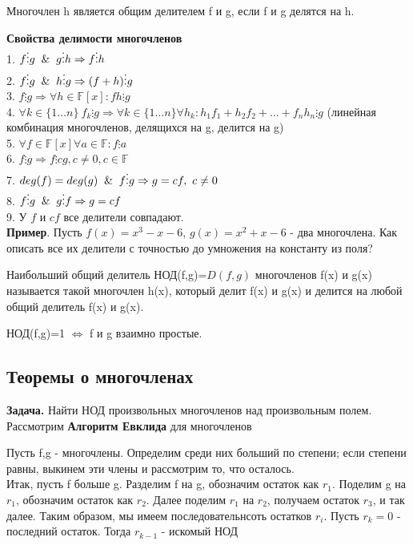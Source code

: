 \begin{defin}
Многочлен h является общим делителем f и g, если f и g делятся на h.
\end{defin}
\textbf{Свойства делимости многочленов}\\
1. $f\vdots g \And g\vdots h \Rightarrow f\vdots h$\\
2. $f\vdots g \And h\vdots g \Rightarrow (f+h)\vdots g$\\
3. $f\vdots g \Rightarrow \forall h \in \mathbb F[x] \colon fh\vdots g$\\
4. $\forall k\in\{1\ldots n\}~f_k\vdots g \Rightarrow \forall k\in\{1\ldots n\}
\forall h_k\colon h_1f_1+h_2f_2+\ldots+f_nh_n\vdots g$
(линейная комбинация многочленов, делящихся на g, делится на g)\\
5. $\forall f\in \mathbb F[x] \forall a\in \mathbb F \colon f\vdots a$\\
6. $f\vdots g \Rightarrow f\vdots cg, c\ne0, c\in\mathbb F$\\
7. $deg(f)=deg(g) \And f\vdots g\Rightarrow g=cf,~c\ne0$\\
8. $f\vdots g \And g\vdots f \Rightarrow g=cf$\\
9. У $f$ и $cf$ все делители совпадают.\\
\textbf{Пример}. Пусть $f(x)=x^3-x-6$, $g(x)=x^2+x-6$ - два многочлена.
Как описать все их делители с точностью до умножения на константу из поля?
\begin{defin}
Наибольший общий делитель НОД(f,g)=$D(f,g)$ многочленов f(x) и g(x) 
называется такой многочлен h(x), который делит f(x) и g(x) и делится на 
любой общий делитель f(x) и g(x).
\end{defin}
НОД(f,g)=1 $\Leftrightarrow $ f и g взаимно простые.\\



\subsection{Теоремы о многочленах}
\textbf{Задача.} Найти НОД произвольных многочленов над произвольным полем. 
Рассмотрим \textbf{Алгоритм Евклида} для многочленов

Пусть f,g - многочлены. Определим среди них больший по степени;
если степени равны, выкинем эти члены и рассмотрим то, что
осталось.\\
Итак, пусть f больше g. Разделим f на g, обозначим остаток как
$r_1$. Поделим g на $r_1$, обозначим остаток как $r_2$. Далее
поделим $r_1$ на $r_2$, получаем остаток $r_3$, и так далее. Таким
образом, мы имеем последовательнсоть остатков $r_i$. Пусть $r_k=0$ -
последний остаток. Тогда $r_{k-1}$ - искомый НОД

